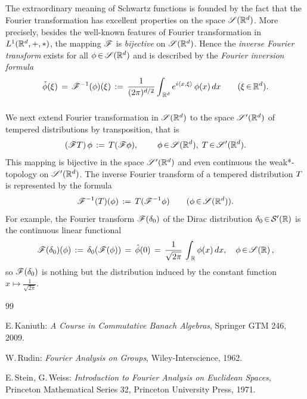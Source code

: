 \documentclass[11pt,twoside]{article}
\begin{document}
\subparagraph{}
The extraordinary meaning of Schwartz functions is founded by the fact that
the Fourier transformation has excellent properties on the space $\mathscr{S}({\mathbb{R}}^d)$.
More precisely,
besides the well-known features of Fourier transformation in $L^1({\mathbb{R}}^d,+,\ast)$,
the mapping $\mathscr{F}$ is \textit{bijective} on $\mathscr{S}({\mathbb{R}}^d)$.
Hence the \textit{inverse Fourier transform} exists for all $\phi {\,\in\,} \mathscr{S}({\mathbb{R}}^d)$
and is described by the \textit{Fourier inversion formula}
\[
\check{\phi}(\xi) \,=\, 
\mathscr{F}^{-1}(\phi)(\xi) \,:=\,
\frac{1}{(2\pi)^{d/2}}
\int_{\,{\mathbb{R}}^d} e^{i \langle x,\xi \rangle} \, \phi(x) \, dx
\quad \quad (\xi {\,\in\,} {\mathbb{R}}^d).
\]

\subparagraph{}
We next extend Fourier transformation in $\mathscr{S}({\mathbb{R}}^d)$ to the space $\mathscr{S}'({\mathbb{R}}^d)$
of tempered distributions by transposition,
that is
\[
(\mathscr{F} T) \, \phi \, := \, T(\mathscr{F} \phi),
\quad \quad \; \phi {\,\in\,} \mathscr{S}({\mathbb{R}}^d), \; T {\,\in\,} \mathscr{S}'({\mathbb{R}}^d).
\]
This mapping is bijective in the space $\mathscr{S}'({\mathbb{R}}^d)$
and even continuous {\wrt} the weak*-topology on $\mathscr{S}'({\mathbb{R}}^d)$.
The inverse Fourier transform of a tempered distribution $T$
is represented by the formula
\[
\mathscr{F}^{-1}(T)(\phi) \, := \, T(\mathscr{F}^{-1} \phi)
\quad \quad (\phi {\,\in\,} \mathscr{S}({\mathbb{R}}^d)).
\]
For example,
the Fourier transform $\mathscr{F}(\delta_0)$ of the Dirac distribution
$\delta_0 {\,\in\,} {\mathcal{S}}'({\mathbb{R}})$ is the continuous linear functional
\[
\FT(\delta_0)(\phi) \, := \,
\delta_0(\FT(\phi)) \= \hat{\phi}(0) \=
\frac{1}{\sqrt{2\pi}} \, \int_{\,\R} \phi(x) \, dx,
\quad \phi \xeof \SR1\,,
\]
so $\mathscr{F}(\delta_0)$ is nothing but the distribution induced by
the constant function $x \mapsto \frac{1}{\sqrt{2\pi}}$.

\newpage
\thispagestyle{empty}

\begin{thebibliography}{99}
\begin{small}

 E.\,Kaniuth:
\textit{A Course in Commutative Banach Algebras},
Springer GTM 246, 2009.

 W.\,Rudin:
\textit{Fourier Analysis on Groups},
Wiley-Interscience, 1962.

 E.\,Stein, G.\,Weiss:
\textit{Introduction to Fourier Analysis on Euclidean Spaces},
Princeton Mathematical Series 32, Princeton University Press, 1971.

\end{small}
\end{thebibliography}

\end{document}
